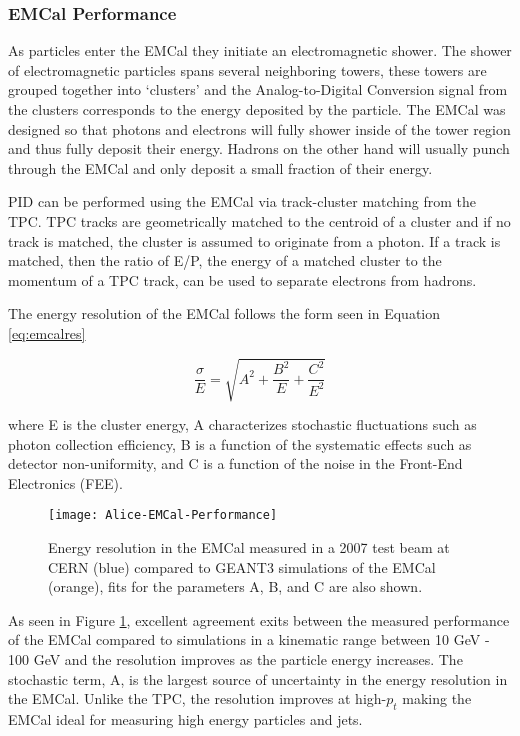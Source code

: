 \subsubsection{EMCal Performance}
As particles enter the EMCal they initiate an electromagnetic shower.  The shower of electromagnetic particles spans several neighboring towers, these towers are grouped together into `clusters' and the Analog-to-Digital Conversion signal from the clusters corresponds to the energy deposited by the particle.  The EMCal was designed so that photons and electrons will fully shower inside of the tower region and thus fully deposit their energy.  Hadrons on the other hand will usually punch through the EMCal and only deposit a small fraction of their energy. 

 PID can be performed using the EMCal via track-cluster matching from the TPC.  TPC tracks are geometrically matched to the centroid of a cluster and if no track is matched, the cluster is assumed to originate from a photon. If a track is matched, then the ratio of E/P, the energy of a matched cluster to the momentum of a TPC track, can be used to separate electrons from hadrons.

The energy resolution of the EMCal follows the form seen in Equation \ref{eq:emcalres}



\begin{equation}
\frac{\sigma}{E} = \sqrt{ A^{2} + \frac{B^{2}}{E} + \frac{C^{2}}{E^{2}}  }
\label{eq:emcalres}
\end{equation}

\noindent
where E is the cluster energy, A characterizes stochastic fluctuations such as photon collection efficiency, B is a function of the systematic effects such as detector non-uniformity, and C is a function of the noise in the Front-End Electronics (FEE). 

\begin{figure}[h]
\texttt{[image: Alice-EMCal-Performance]}
\centering
\caption{Energy resolution in the EMCal measured in a 2007 test beam at CERN (blue) compared to GEANT3 simulations of the EMCal (orange), fits for the parameters A, B, and C are also shown\cite{Abeysekara:2010ze}.}
\label{fig:EMCalres}
\end{figure}


As seen in Figure \ref{fig:EMCalres}, excellent agreement exits between the measured performance of the EMCal compared to simulations in a kinematic range between 10 GeV - 100 GeV and the resolution improves as the particle energy increases.  The stochastic term, A, is the largest source of uncertainty in the energy resolution in the EMCal.  Unlike the TPC, the resolution improves at high-$p_{t}$ making the EMCal ideal for measuring high energy particles and jets.


